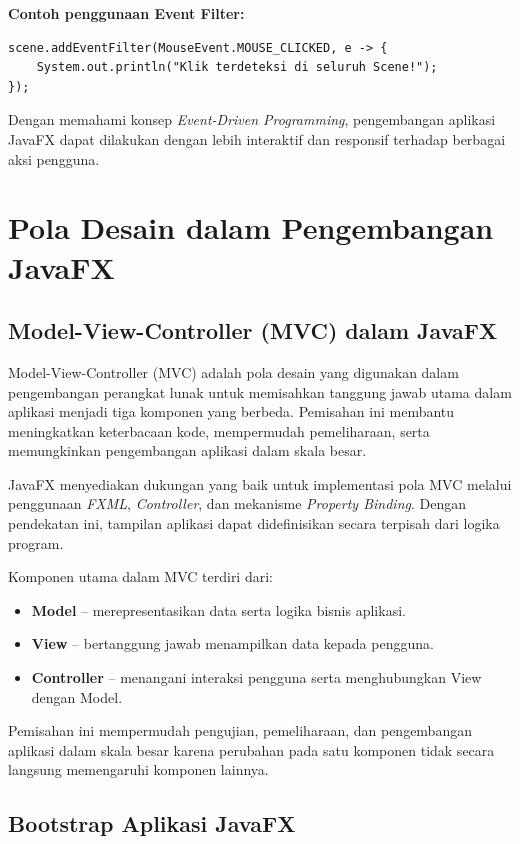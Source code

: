 \textbf{Contoh penggunaan Event Filter:}
\begin{lstlisting}[style=JavaStyle, caption=Menambahkan Event Filter pada Scene]
scene.addEventFilter(MouseEvent.MOUSE_CLICKED, e -> {
	System.out.println("Klik terdeteksi di seluruh Scene!");
});
\end{lstlisting}

Dengan memahami konsep \textit{Event-Driven Programming}, pengembangan aplikasi JavaFX dapat dilakukan dengan lebih interaktif dan responsif terhadap berbagai aksi pengguna.

\section{Pola Desain dalam Pengembangan JavaFX}

\subsection{Model-View-Controller (MVC) dalam JavaFX}

Model-View-Controller (MVC) adalah pola desain yang digunakan dalam pengembangan perangkat lunak untuk memisahkan tanggung jawab utama dalam aplikasi menjadi tiga komponen yang berbeda. Pemisahan ini membantu meningkatkan keterbacaan kode, mempermudah pemeliharaan, serta memungkinkan pengembangan aplikasi dalam skala besar.

JavaFX menyediakan dukungan yang baik untuk implementasi pola MVC melalui penggunaan \textit{FXML}, \textit{Controller}, dan mekanisme \textit{Property Binding}. Dengan pendekatan ini, tampilan aplikasi dapat didefinisikan secara terpisah dari logika program.

Komponen utama dalam MVC terdiri dari:

\begin{itemize}
\item \textbf{Model} – merepresentasikan data serta logika bisnis aplikasi.
\item \textbf{View} – bertanggung jawab menampilkan data kepada pengguna.
\item \textbf{Controller} – menangani interaksi pengguna serta menghubungkan View dengan Model.
\end{itemize}

Pemisahan ini mempermudah pengujian, pemeliharaan, dan pengembangan aplikasi dalam skala besar karena perubahan pada satu komponen tidak secara langsung memengaruhi komponen lainnya.

\subsection{Bootstrap Aplikasi JavaFX}

